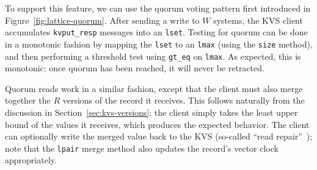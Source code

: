 To support this feature, we can use the \lang quorum voting pattern first
introduced in Figure~\ref{fig:lattice-quorum}. After sending a write to $W$
systems, the KVS client accumulates \texttt{kvput\_resp} messages into an
\texttt{lset}. Testing for quorum can be done in a monotonic fashion by mapping
the \texttt{lset} to an \texttt{lmax} (using the \texttt{size} method), and then
performing a threshold test using \texttt{gt\_eq} on \texttt{lmax}. As expected,
this is monotonic: once quorum has been reached, it will never be retracted.

Quorum reads work in a similar fashion, except that the client must also merge
together the $R$ versions of the record it receives. This follows naturally from
the discussion in Section~\ref{sec:kvs-versions}: the client simply takes the
least upper bound of the values it receives, which produces the expected
behavior. The client can optionally write the merged value back to the KVS
(so-called ``read repair''~\cite{DeCandia2007}); note that the \texttt{lpair}
merge method also updates the record's vector clock appropriately.
